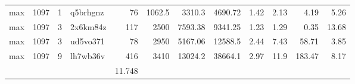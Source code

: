 \documentclass[9pt,a4paper,twocolumn,lineno]{article}
\begin{document}
\begin{table}
\begin{tabular}{lrrlrrrrrrrr}
 max      & 1097 &   1 & q5brhgnz &  76 &   1062.5 &  3310.3  &  4690.72 &  1.42 &   2.13 &   4.19 &         5.26 \\
 max      & 1097 &   3 & 2x6km84z & 117 &   2500   &  7593.38 &  9341.25 &  1.23 &   1.29 &   0.35 &        13.68 \\
 max      & 1097 &   3 & ud5vo371 &  78 &   2950   &  5167.06 & 12588.5  &  2.44 &   7.43 &  58.71 &         3.85 \\
 max      & 1097 &   9 & lh7wb36v & 416 &   3410   & 13024.2  & 38664.1  &  2.97 &  11.9  & 183.47 &         8.17 \\
\hline
 &&&& 11.748 &&&&&&& 
\\
\end{tabular}
\end{table}\label{table:S1}
\end{document}
